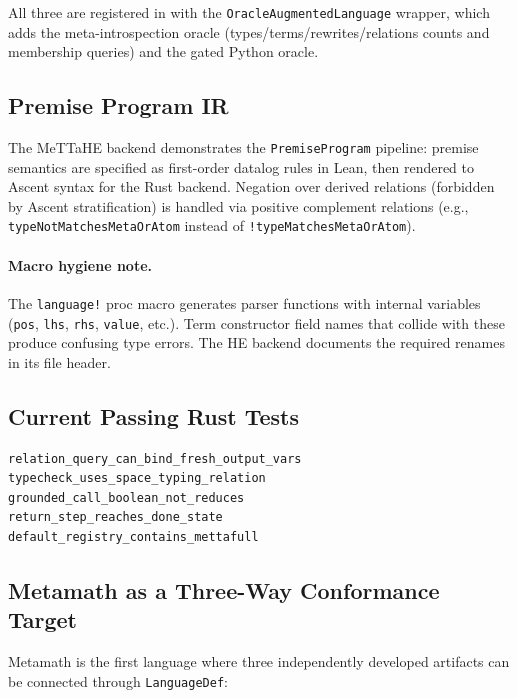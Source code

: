 \documentclass[11pt]{article}
\newcommand{\code}[1]{\texttt{#1}}
\newcommand{\codepath}[1]{\path{#1}}
\begin{document}
All three are registered in \codepath{repl/src/registry.rs} with the
\code{OracleAugmentedLanguage} wrapper, which adds the meta-introspection
oracle (types/terms/rewrites/relations counts and membership queries) and
the gated Python oracle.

\subsection{Premise Program IR}

The MeTTaHE backend demonstrates the \code{PremiseProgram} pipeline:
premise semantics are specified as first-order datalog rules in Lean,
then rendered to Ascent syntax for the Rust backend.  Negation over
derived relations (forbidden by Ascent stratification) is handled via
positive complement relations (e.g., \code{typeNotMatchesMetaOrAtom}
instead of \code{!typeMatchesMetaOrAtom}).

\paragraph{Macro hygiene note.}
The \code{language!} proc macro generates parser functions with internal
variables (\code{pos}, \code{lhs}, \code{rhs}, \code{value}, etc.).
Term constructor field names that collide with these produce confusing
type errors.  The HE backend documents the required renames in its file
header.

\subsection{Current Passing Rust Tests}

\begin{lstlisting}[language={},caption={MeTTa Rust canaries (all passing)}]
relation_query_can_bind_fresh_output_vars
typecheck_uses_space_typing_relation
grounded_call_boolean_not_reduces
return_step_reaches_done_state
default_registry_contains_mettafull
\end{lstlisting}

\subsection{Metamath as a Three-Way Conformance Target}

Metamath is the first language where three independently developed artifacts
can be connected through \code{LanguageDef}:
\end{document}
